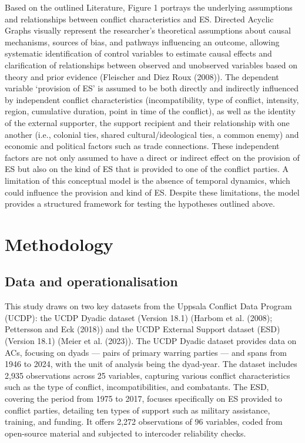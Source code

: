 \documentclass[
]{article}
\begin{document}
Based on the outlined Literature, Figure 1 portrays the underlying
assumptions and relationships between conflict characteristics and ES.
Directed Acyclic Graphs visually represent the researcher's theoretical
assumptions about causal mechanisms, sources of bias, and pathways
influencing an outcome, allowing systematic identification of control
variables to estimate causal effects and clarification of relationships
between observed and unobserved variables based on theory and prior
evidence (Fleischer and Diez Roux (2008)). The dependent variable
`provision of ES' is assumed to be both directly and indirectly
influenced by independent conflict characteristics (incompatibility,
type of conflict, intensity, region, cumulative duration, point in time
of the conflict), as well as the identity of the external supporter, the
support recipient and their relationship with one another (i.e.,
colonial ties, shared cultural/ideological ties, a common enemy) and
economic and political factors such as trade connections. These
independent factors are not only assumed to have a direct or indirect
effect on the provision of ES but also on the kind of ES that is
provided to one of the conflict parties. A limitation of this conceptual
model is the absence of temporal dynamics, which could influence the
provision and kind of ES. Despite these limitations, the model provides
a structured framework for testing the hypotheses outlined above.

\section{Methodology}\label{methodology}

\subsection{Data and
operationalisation}\label{data-and-operationalisation}

This study draws on two key datasets from the Uppsala Conflict Data
Program (UCDP): the UCDP Dyadic dataset (Version 18.1) (Harbom et al.
(2008); Pettersson and Eck (2018)) and the UCDP External Support dataset
(ESD) (Version 18.1) (Meier et al. (2023)). The UCDP Dyadic dataset
provides data on ACs, focusing on dyads --- pairs of primary warring
parties --- and spans from 1946 to 2024, with the unit of analysis being
the dyad-year. The dataset includes 2,935 observations across 25
variables, capturing various conflict characteristics such as the type
of conflict, incompatibilities, and combatants. The ESD, covering the
period from 1975 to 2017, focuses specifically on ES provided to
conflict parties, detailing ten types of support such as military
assistance, training, and funding. It offers 2,272 observations of 96
variables, coded from open-source material and subjected to intercoder
reliability checks.
\end{document}
